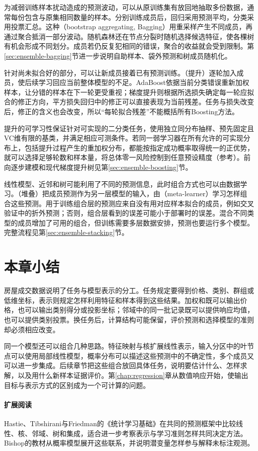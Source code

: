 为减弱训练样本扰动造成的预测波动，可以从原训练集有放回地抽取多份数据，通常每份包含与原集相同数量的样本。分别训练成员后，回归采用预测平均，分类采用投票汇总。这种（bootstrap aggregating, Bagging）用重采样产生不同成员，再通过聚合抵消一部分波动。随机森林还在节点分裂时随机选择候选特征，使各棵树有机会形成不同划分。成员若仍反复犯相同的错误，聚合的收益就会受到限制。第\ref{sec:ensemble-bagging}节进一步说明自助样本、袋外预测和树成员随机化。

针对尚未拟合好的部分，可以让新成员接着已有预测训练。（提升）逐轮加入成员，使后续学习回应当前整体模型的不足。AdaBoost依据当前分类错误重新加权样本，让分错的样本在下一轮更受重视；梯度提升则根据所选损失确定每一轮应拟合的修正方向，平方损失回归中的修正可以直接表现为当前残差。任务与损失改变后，修正的含义也会改变，所以“每轮拟合残差”不能概括所有Boosting方法。

提升的可学习性保证针对可实现的二分类任务，使用独立同分布抽样、预先固定且VC维有限的基类，并满足相应可测条件。若同一弱学习器在所有允许的可实现分布上，包括提升过程产生的重加权分布，都能按指定成功概率取得统一的正优势，就可以选择足够轮数和样本量，将总体零一风险控制到任意预设精度（参考）。前向逐步建模和现代梯度提升树见第\ref{sec:ensemble-boosting}节。

线性模型、近邻和树可能利用了不同的预测信息，此时组合方式也可以由数据学习。（堆叠）把成员预测作为另一层模型的输入，由（meta-learner）学习怎样组合这些预测。用于训练组合层的预测应来自没有用对应样本拟合的成员，例如交叉验证中的折外预测；否则，组合层看到的误差可能小于部署时的误差。混合不同类型的成员增加了可用的组合，但训练需要多层数据安排，预测也要运行多个模型。完整流程见第\ref{sec:ensemble-stacking}节。

\section{本章小结}
\label{sec:classic-overview-summary}

房屋成交数据说明了任务与模型表示的分工。任务规定要得到价格、类别、群组或低维坐标，表示则规定怎样利用特征和样本得到这些结果。加权和既可以输出价格，也可以输出类别得分或投影坐标；邻域中的同一批记录既可以提供响应均值，也可以提供类别投票。换任务后，计算结构可能保留，评价预测和选择模型的准则却必须相应改变。

同一个模型还可以组合几种思路。特征映射与核扩展线性表示，输入分区中的叶节点可以使用局部线性模型，概率分布可以描述这些预测中的不确定性，多个成员又可以进一步集成。后续章节把这些组合放回具体任务，说明要估计什么、怎样求解，以及用什么新样本证据评价。第\ref{chap:regression}章从数值响应开始，使输出目标与表示方式的区别成为一个可计算的问题。

\paragraph{扩展阅读}
Hastie、Tibshirani与Friedman的《统计学习基础》在共同的预测框架中比较线性、核、邻域、树和集成，适合进一步考察表示与学习准则怎样共同决定方法。Bishop的教材从概率模型展开这些联系，并说明潜变量怎样参与解释未标注观测。
